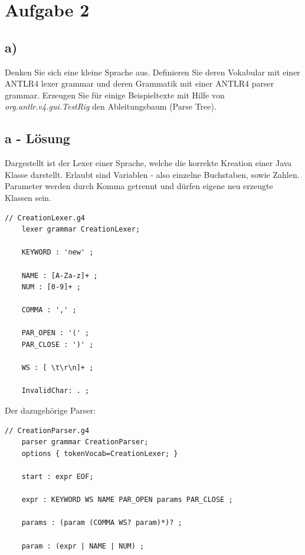 \section*{Aufgabe 2}
\subsection*{a)}
Denken Sie sich eine kleine Sprache aus.
Definieren Sie deren Vokabular mit einer ANTLR4 lexer grammar und deren Grammatik mit einer ANTLR4 parser grammar.
Erzeugen Sie für einige Beispieltexte mit Hilfe von \textit{org.antlr.v4.gui.TestRig} den Ableitungsbaum (Parse Tree).

\subsection*{a - Lösung}
Dargestellt ist der Lexer einer Sprache, welche die korrekte Kreation einer Java Klasse darstellt.
Erlaubt sind Variablen - also einzelne Buchstaben, sowie Zahlen.
Parameter werden durch Komma getrennt und dürfen eigene neu erzeugte Klassen sein.
\newline
\begin{lstlisting}[label={lst:Aufgabe2a_lexer}, style=ANTLR]
    // CreationLexer.g4
    lexer grammar CreationLexer;

    KEYWORD : 'new' ;

    NAME : [A-Za-z]+ ;
    NUM : [0-9]+ ;

    COMMA : ',' ;

    PAR_OPEN : '(' ;
    PAR_CLOSE : ')' ;

    WS : [ \t\r\n]+ ;

    InvalidChar: . ;
\end{lstlisting}

\newpage

Der dazugehörige Parser:
\begin{lstlisting}[label={lst:Aufgabe2a_parser}, style=ANTLR]
    // CreationParser.g4
    parser grammar CreationParser;
    options { tokenVocab=CreationLexer; }

    start : expr EOF;

    expr : KEYWORD WS NAME PAR_OPEN params PAR_CLOSE ;

    params : (param (COMMA WS? param)*)? ;

    param : (expr | NAME | NUM) ;
\end{lstlisting}
\newline

